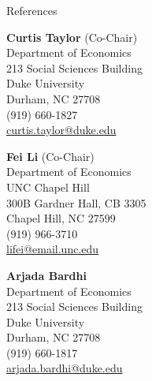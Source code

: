 \begin{rSection}{References}
	
	\medskip 
	
	\begin{minipage}{.31\linewidth}
		{\large \textbf{Curtis Taylor} (Co-Chair)}	\\[3pt]
		Department of Economics	\\		
		213 Social Sciences Building\\		
		Duke University\\		
		Durham, NC 27708\\[3pt]
		(919) 660-1827\\[3pt]
		\href{mailto:curtis.taylor@duke.edu}{curtis.taylor@duke.edu}
	\end{minipage}
	\hspace*{2pt}
	\begin{minipage}{.31\linewidth}
		{\large \textbf{Fei Li} (Co-Chair) }	\\[3pt]
		Department of Economics\\
		UNC Chapel Hill\\
		300B Gardner Hall, CB 3305\\
		Chapel Hill, NC 27599\\[3pt]
		(919) 966-3710\\[3pt]
		\href{mailto:lifei@email.unc.edu}{lifei@email.unc.edu}
	\end{minipage}
	\hspace*{2pt}
	\begin{minipage}{.31\linewidth}
		{\large \textbf{Arjada Bardhi}}	\\[3pt]
		Department of Economics	\\		
		213 Social Sciences Building\\		
		Duke University\\		
		Durham, NC 27708\\[3pt]
		(919) 660-1817\\[3pt]
		\href{mailto:arjada.bardhi@duke.edu}{arjada.bardhi@duke.edu}
	\end{minipage}
\end{rSection}